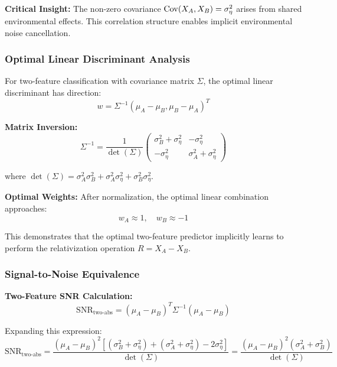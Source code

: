 \textbf{Critical Insight:} The non-zero covariance $\operatorname{Cov}(X_A, X_B) = \sigma_\eta^2$ arises from shared environmental effects. This correlation structure enables implicit environmental noise cancellation.

\subsubsection{Optimal Linear Discriminant Analysis}

For two-feature classification with covariance matrix $\Sigma$, the optimal linear discriminant has direction:
\begin{equation}
w = \Sigma^{-1}(\mu_A - \mu_B, \mu_B - \mu_A)^T
\end{equation}

\textbf{Matrix Inversion:}
\begin{equation}
\Sigma^{-1} = \frac{1}{\det(\Sigma)} \begin{pmatrix} \sigma_B^2 + \sigma_\eta^2 & -\sigma_\eta^2 \\ -\sigma_\eta^2 & \sigma_A^2 + \sigma_\eta^2 \end{pmatrix}
\end{equation}

where $\det(\Sigma) = \sigma_A^2\sigma_B^2 + \sigma_A^2\sigma_\eta^2 + \sigma_B^2\sigma_\eta^2$.

\textbf{Optimal Weights:}
After normalization, the optimal linear combination approaches:
\begin{equation}
w_A \approx 1, \quad w_B \approx -1
\end{equation}

This demonstrates that the optimal two-feature predictor implicitly learns to perform the relativization operation $R = X_A - X_B$.

\subsubsection{Signal-to-Noise Equivalence}

\textbf{Two-Feature SNR Calculation:}
\begin{equation}
\text{SNR}_{\text{two-abs}} = (\mu_A - \mu_B)^T \Sigma^{-1} (\mu_A - \mu_B)
\end{equation}

Expanding this expression:
\begin{equation}
\text{SNR}_{\text{two-abs}} = \frac{(\mu_A - \mu_B)^2 [(\sigma_B^2 + \sigma_\eta^2) + (\sigma_A^2 + \sigma_\eta^2) - 2\sigma_\eta^2]}{\det(\Sigma)} = \frac{(\mu_A - \mu_B)^2 (\sigma_A^2 + \sigma_B^2)}{\det(\Sigma)}
\end{equation}

